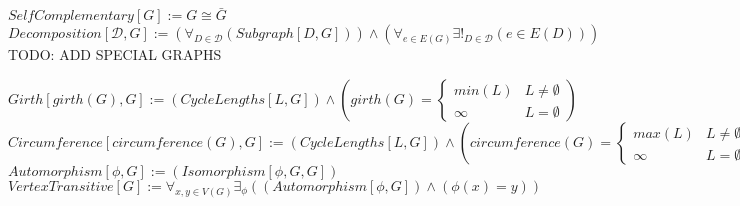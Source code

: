 \documentclass{book}
\newcommand{\abr}{:=}
\newcommand{\pr}[1]{\left(#1\right)}
\newcommand{\st}{\mathbin{|}}
\newcommand{\utup}[1]{\{#1\}}
\begin{document}
$SelfComplementary[G] \abr G \cong \bar{G}$ \\
$Decomposition[\mathcal{D}, G] \abr \pr{\forall_{D \in \mathcal{D}}(Subgraph[D, G])} \land \pr{\forall_{e \in E(G)} \exists!_{D \in \mathcal{D}}\pr{e \in E(D)}}$ \\

TODO: ADD SPECIAL GRAPHS

$Girth[girth(G), G] \abr (CycleLengths[L, G]) \land \left(girth(G) =
\begin{cases}
  min(L) & L \neq \emptyset \\
  \infty & L = \emptyset
\end{cases}\right)$ \\
$Circumference[circumference(G), G] \abr (CycleLengths[L, G]) \land \left(circumference(G) =
\begin{cases}
  max(L) & L \neq \emptyset \\
  \infty & L = \emptyset
\end{cases}\right)$ \\

$Automorphism[\phi, G] \abr (Isomorphism[\phi, G, G])$ \\ %
$VertexTransitive[G] \abr \forall_{x, y \in V(G)} \exists_{\phi}\pr{(Automorphism[\phi, G]) \land \pr{\phi(x) = y}}$ \\
\end{document}
